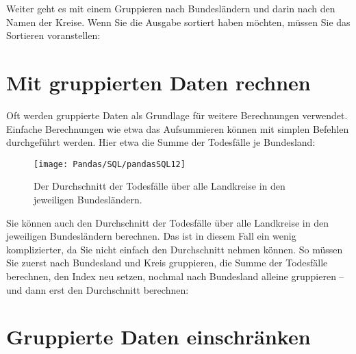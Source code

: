 Weiter geht es mit einem Gruppieren nach Bundesländern und darin nach den Namen der Kreise. Wenn Sie die Ausgabe sortiert haben möchten, müssen Sie das Sortieren voranstellen:

\medskip



\medskip

\section{Mit gruppierten Daten rechnen}

Oft werden gruppierte Daten als Grundlage für weitere Berechnungen verwendet. Einfache Berechnungen wie etwa das Aufsummieren können mit simplen Befehlen durchgeführt werden. Hier etwa die Summe der Todesfälle je Bundesland:

\medskip



\medskip

\begin{figure}
	\texttt{[image: Pandas/SQL/pandasSQL12]}
	\caption{Der Durchschnitt der Todesfälle über alle Landkreise in den jeweiligen Bundesländern.}
\end{figure}


Sie können auch den Durchschnitt der Todesfälle über alle Landkreise in den jeweiligen Bundesländern berechnen. Das ist in diesem Fall ein wenig komplizierter, da Sie nicht einfach den Durchschnitt nehmen können. So müssen Sie zuerst nach Bundesland und Kreis gruppieren, die Summe der Todesfälle berechnen, den Index neu setzen, nochmal nach Bundesland alleine gruppieren – und dann erst den Durchschnitt berechnen:

\medskip



\medskip

\section{Gruppierte Daten einschränken}

